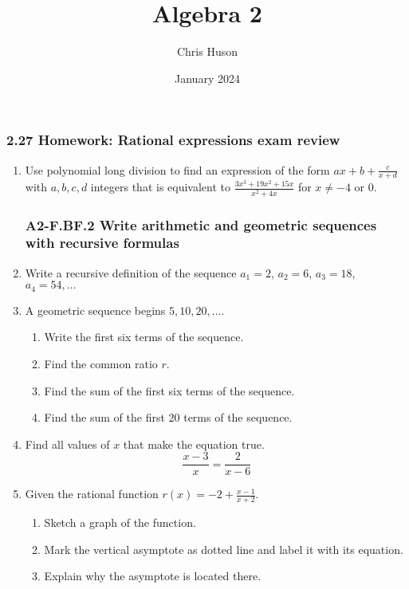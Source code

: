\documentclass[12pt, twoside]{article}
\title{Algebra 2}
\author{Chris Huson}
\date{January 2024}
\begin{document}
\subsubsection*{2.27 Homework: Rational expressions exam review}
\begin{enumerate}
\item Use polynomial long division to find an expression of the form $ax+b+\frac{c}{x+d}$ with $a,b,c,d$ integers that is equivalent to $\displaystyle \frac{3x^3 + 19x^2 + 15x}{x^2 + 4x}
$ for $x \neq -4 \text{ or } 0$.
\vspace{8cm}


\subsubsection*{A2-F.BF.2 Write arithmetic and geometric sequences with recursive formulas}
\item Write a recursive definition of the sequence $a_1 = 2$, $a_2 = 6$, $a_3 = 18$, $a_4 = 54, \ldots$ \vspace{2cm}

\item A geometric sequence begins $5, 10, 20, \ldots$.
\begin{enumerate}[itemsep=0.5cm]
    \item Write the first six terms of the sequence.
    \item Find the common ratio $r$. 
    \item Find the sum of the first six terms of the sequence. \vspace{1cm}
    \item Find the sum of the first 20 terms of the sequence.
\end{enumerate}

\newpage
\item  Find all values of $x$ that make the equation true.
$$\frac{x-3}{x}=\frac{2}{x-6}$$ \vspace{4cm}

\item Given the rational function $\displaystyle r(x)= -2 + \frac{x-1}{x+2}$. 
    \begin{enumerate}[itemsep=0.25cm]
        \item Sketch a graph of the function.
        \item Mark the vertical asymptote as dotted line and label it with its equation.
        \item Explain why the asymptote is located there.
    \end{enumerate}
    \begin{center}
    \end{center}


\end{enumerate}
\end{document}
